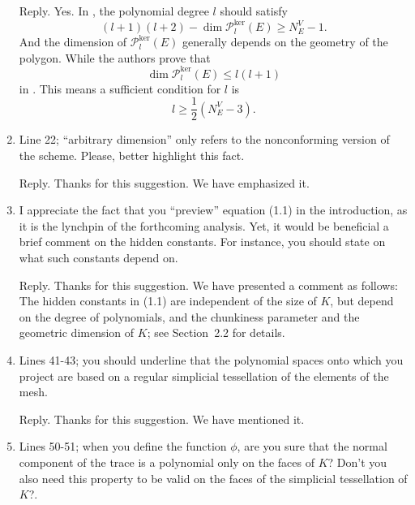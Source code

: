 \documentclass[10pt]{amsart}
\theoremstyle{definition}
\theoremstyle{remark}
\begin{document}
\begin{enumerate}[1.]
\smallskip \noindent \textcolor[rgb]{1.00,0.00,0.00}{Reply.}
Yes. In \cite{BerroneBorioMarcon2021}, the polynomial degree $l$ should satisfy
$$
(l+1)(l+2) - \dim\mathcal{P}_l^{\textrm{ker}}(E)\geq N_E^V-1.
$$
And the dimension of $\mathcal{P}_l^{\textrm{ker}}(E)$ generally depends on the geometry of the polygon. While the authors prove that
$$
\dim\mathcal{P}_l^{\textrm{ker}}(E)\leq l(l+1)
$$
in \cite[Theorem 2]{BerroneBorioMarcon2021}. This means a sufficient condition for $l$ is 
$$
l\geq \frac{1}{2}(N_E^V-3).
$$

\medskip

\item \textsf{Line 22; ``arbitrary dimension'' only refers to the nonconforming version of the scheme. Please, better highlight this fact.}

\smallskip \noindent \textcolor[rgb]{1.00,0.00,0.00}{Reply.}
Thanks for this suggestion. We have emphasized it.

\medskip

\item \textsf{I appreciate the fact that you “preview” equation (1.1) in the introduction, as it is the lynchpin of the forthcoming analysis. Yet, it would be beneficial a brief comment on the hidden constants. For instance, you should state on what such constants depend on.}

\smallskip \noindent \textcolor[rgb]{1.00,0.00,0.00}{Reply.}
Thanks for this suggestion. We have presented a comment as follows: The hidden constants in (1.1) are independent of the size of $K$, but depend on the degree of polynomials, and the chunkiness parameter and the geometric dimension of $K$; see Section~2.2 for details.

\medskip

\item \textsf{Lines 41-43; you should underline that the polynomial spaces onto which you project are based on a regular simplicial tessellation of the elements of the mesh.}

\smallskip \noindent \textcolor[rgb]{1.00,0.00,0.00}{Reply.}
Thanks for this suggestion. We have mentioned it.


\medskip

\item \textsf{Lines 50-51; when you define the function $\phi$, are you sure that the normal component of the trace is a polynomial only on the faces of $K$? Don't you also need this property to be valid on the faces of the simplicial tessellation of $K$?.}


\end{enumerate}
\end{document}
